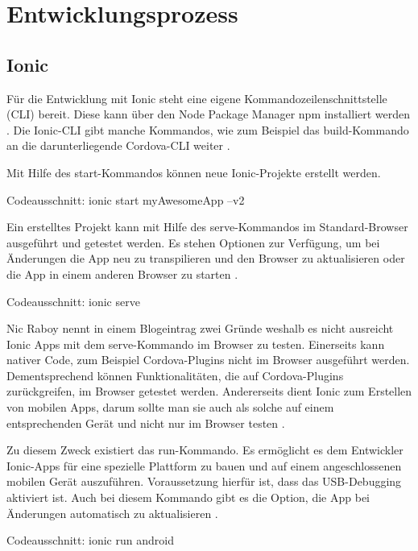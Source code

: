 \chapter{Entwicklungsprozess}
\label{Entwicklungsprozess}

\section{Ionic}
\label{Ionic}
Für die Entwicklung mit Ionic steht eine eigene Kommandozeilenschnittstelle (CLI) bereit. Diese kann über den Node Package Manager npm installiert werden \cite{ionic:cli}. Die Ionic-CLI gibt manche Kommandos, wie zum Beispiel das build-Kommando an die darunterliegende Cordova-CLI weiter \cite{ionic:build}.

Mit Hilfe des start-Kommandos können neue Ionic-Projekte erstellt werden.

Codeausschnitt: ionic start myAwesomeApp --v2 \cite{ionic:cli}

Ein erstelltes Projekt kann mit Hilfe des serve-Kommandos im Standard-Browser ausgeführt und getestet werden. Es stehen Optionen zur Verfügung, um bei Änderungen die App neu zu transpilieren und den Browser zu aktualisieren oder die App in einem anderen Browser zu starten \cite{ionic:serve}.

Codeausschnitt: ionic serve \cite{ionic:cli}

Nic Raboy nennt in einem Blogeintrag zwei Gründe weshalb es nicht ausreicht Ionic Apps mit dem serve-Kommando im Browser zu testen. Einerseits kann nativer Code, zum Beispiel Cordova-Plugins nicht im Browser ausgeführt werden. Dementsprechend können Funktionalitäten, die auf Cordova-Plugins zurückgreifen, im Browser getestet werden. Andererseits dient Ionic zum Erstellen von mobilen Apps, darum sollte man sie auch als solche auf einem entsprechenden Gerät und nicht nur im Browser testen \cite{raboy:serve}.

Zu diesem Zweck existiert das run-Kommando. Es ermöglicht es dem Entwickler Ionic-Apps für eine spezielle Plattform zu bauen und auf einem angeschlossenen mobilen Gerät auszuführen. Voraussetzung hierfür ist, dass das USB-Debugging aktiviert ist. Auch bei diesem Kommando gibt es die Option, die App bei Änderungen automatisch zu aktualisieren \cite{ionic:run}.

Codeausschnitt: ionic run android